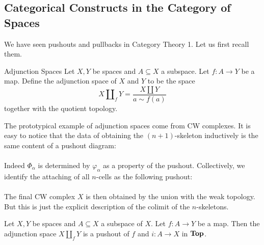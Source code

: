 \documentclass[a4paper]{article}
\begin{document}
\subsection{Categorical Constructs in the Category of Spaces}
We have seen pushouts and pullbacks in Category Theory 1. Let us first recall them. 

\begin{defn}{Adjunction Spaces}{} Let $X,Y$ be spaces and $A\subseteq X$ a subspace. Let $f:A\to Y$ be a map. Define the adjunction space of $X$ and $Y$ to be  the space $$X\amalg_fY=\frac{X\amalg Y}{a\sim f(a)}$$ together with the quotient topology. 
\end{defn}

The prototypical example of adjunction spaces come from CW complexes. It is easy to notice that the data of obtaining the $(n+1)$-skeleton inductively is the same content of a pushout diagram: \\
\\
Indeed $\Phi_\alpha$ is determined by $\varphi_\alpha$ as a property of the pushout. Collectively, we identify the attaching of all $n$-cells as the following pushout: \\
\\

The final CW complex $X$ is then obtained by the union with the weak topology. But this is just the explicit description of the colimit of the $n$-skeletons. 

\begin{prp}{}{} Let $X,Y$ be spaces and $A\subseteq X$ a subspace of $X$. Let $f:A\to Y$ be a map. Then the adjunction space $X\amalg_f Y$ is a pushout of $f$ and $i:A\to X$ in $\bold{Top}$. 
\end{prp}
\end{document}
